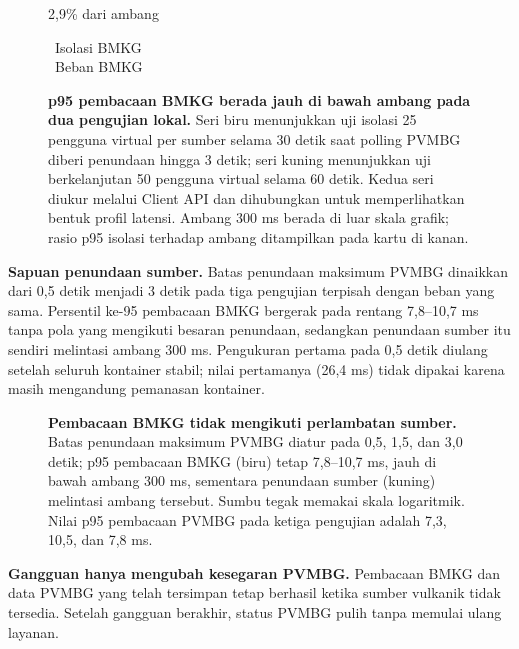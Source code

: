 \documentclass{fairmeta}
\begin{document}
\begin{figure}[htbp]
\begin{minipage}[c]{0.30\linewidth}
\begin{tcolorbox}[
  colback=metabg,frame hidden,
  borderline west={2pt}{0pt}{metablue},
  arc=2mm,
  left=3mm,right=2.5mm,top=2.5mm,bottom=2.5mm
]
\par\smallskip
{\footnotesize 2,9\% dari ambang}
\end{tcolorbox}
\vspace{0.5em}
{\footnotesize
{}\ Isolasi BMKG\\
\ Beban BMKG
}
\end{minipage}
\caption[Persentil latensi pembacaan BMKG]{\textbf{p95 pembacaan BMKG berada jauh di bawah ambang pada dua pengujian lokal.} Seri biru menunjukkan uji isolasi 25 pengguna virtual per sumber selama 30 detik saat polling PVMBG diberi penundaan hingga 3 detik; seri kuning menunjukkan uji berkelanjutan 50 pengguna virtual selama 60 detik. Kedua seri diukur melalui Client API dan dihubungkan untuk memperlihatkan bentuk profil latensi. Ambang 300 ms berada di luar skala grafik; rasio p95 isolasi terhadap ambang ditampilkan pada kartu di kanan.}
\label{fig:load-percentiles}
\end{figure}

\textbf{Sapuan penundaan sumber.} Batas penundaan maksimum PVMBG dinaikkan dari 0,5 detik menjadi 3 detik pada tiga pengujian terpisah dengan beban yang sama. Persentil ke-95 pembacaan BMKG bergerak pada rentang 7,8--10,7 ms tanpa pola yang mengikuti besaran penundaan, sedangkan penundaan sumber itu sendiri melintasi ambang 300 ms. Pengukuran pertama pada 0,5 detik diulang setelah seluruh kontainer stabil; nilai pertamanya (26,4 ms) tidak dipakai karena masih mengandung pemanasan kontainer.

\begin{figure}[htbp]
\centering

\caption[Pembacaan tetap cepat saat sumber melambat]{\textbf{Pembacaan BMKG tidak mengikuti perlambatan sumber.} Batas penundaan maksimum PVMBG diatur pada 0,5, 1,5, dan 3,0 detik; p95 pembacaan BMKG (biru) tetap 7,8--10,7 ms, jauh di bawah ambang 300 ms, sementara penundaan sumber (kuning) melintasi ambang tersebut. Sumbu tegak memakai skala logaritmik. Nilai p95 pembacaan PVMBG pada ketiga pengujian adalah 7,3, 10,5, dan 7,8 ms.}
\label{fig:p2-sweep}
\end{figure}

\textbf{Gangguan hanya mengubah kesegaran PVMBG.} Pembacaan BMKG dan data PVMBG yang telah tersimpan tetap berhasil ketika sumber vulkanik tidak tersedia. Setelah gangguan berakhir, status PVMBG pulih tanpa memulai ulang layanan.
\end{document}
